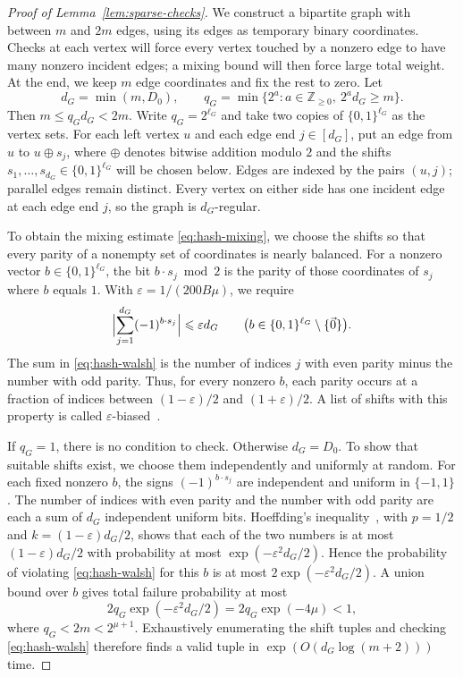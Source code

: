 \begin{proof}[Proof of Lemma~\ref{lem:sparse-checks}]
We construct a bipartite graph with between $m$ and $2m$ edges,
using its edges as temporary binary coordinates. Checks at each vertex
will force every vertex touched by a nonzero edge to have many nonzero
incident edges; a mixing bound will then force large total weight.
At the end, we keep $m$ edge coordinates and fix the rest to zero.
Let
\[
 d_G=\min(m,D_0),
 \qquad
 q_G=\min\{2^a:a\in\mathbb Z_{\ge0},\ 2^a d_G\ge m\}.
\]
Then $m\le q_Gd_G<2m$. Write $q_G=2^{\ell_G}$ and take two copies
of $\{0,1\}^{\ell_G}$ as the vertex sets. For each left vertex $u$
and each edge end $j\in[d_G]$, put an edge from $u$ to $u\oplus s_j$,
where $\oplus$ denotes bitwise addition modulo $2$ and the shifts
$s_1,\ldots,s_{d_G}\in\{0,1\}^{\ell_G}$ will be chosen below.
Edges are indexed by the pairs $(u,j)$; parallel edges remain
distinct. Every vertex on either side has one incident edge at
each edge end $j$, so the graph is $d_G$-regular.

To obtain the mixing estimate \eqref{eq:hash-mixing}, we choose
the shifts so that every parity of a nonempty set of coordinates
is nearly balanced. For a nonzero vector
$b\in\{0,1\}^{\ell_G}$, the bit $b\cdot s_j\bmod2$ is the parity
of those coordinates of $s_j$ where $b$ equals $1$.
With $\varepsilon=1/(200B\mu)$, we require
\begin{equation}\label{eq:hash-walsh}
 \Bigl|\sum_{j=1}^{d_G}(-1)^{b\cdot s_j}\Bigr|
 \le\varepsilon d_G
 \qquad
 \bigl(b\in\{0,1\}^{\ell_G}\setminus\{\vec{0}\}\bigr).
\end{equation}
The sum in \eqref{eq:hash-walsh} is the number of indices $j$
with even parity minus the number with odd parity. Thus, for
every nonzero $b$, each parity occurs at a fraction of indices
between $(1-\varepsilon)/2$ and $(1+\varepsilon)/2$.
A list of shifts with this property is called
$\varepsilon$-biased~\cite[Definitions~2.1--2.2]{NN93}.

If $q_G=1$, there is no condition to check. Otherwise $d_G=D_0$.
To show that suitable shifts exist, we choose them independently
and uniformly at random. For each fixed nonzero $b$, the signs
$(-1)^{b\cdot s_j}$ are independent and uniform in $\{-1,1\}$.
The number of indices with even parity and the number with odd
parity are each a sum of $d_G$ independent uniform bits. Hoeffding's
inequality~\cite[Lemma~3.3]{AW15}, with $p=1/2$ and
$k=(1-\varepsilon)d_G/2$, shows that each of the two numbers is at
most $(1-\varepsilon)d_G/2$ with probability at most
$\exp(-\varepsilon^2d_G/2)$. Hence the probability of violating
\eqref{eq:hash-walsh} for this $b$ is at most
$2\exp(-\varepsilon^2d_G/2)$. A union bound over $b$ gives total
failure probability at most
\[
 2q_G\exp(-\varepsilon^2d_G/2)
 =2q_G\exp(-4\mu)<1,
\]
where $q_G<2m<2^{\mu+1}$. Exhaustively enumerating the shift tuples
and checking \eqref{eq:hash-walsh} therefore finds a valid tuple in
$\exp(O(d_G\log(m+2)))$ time.


\end{proof}
